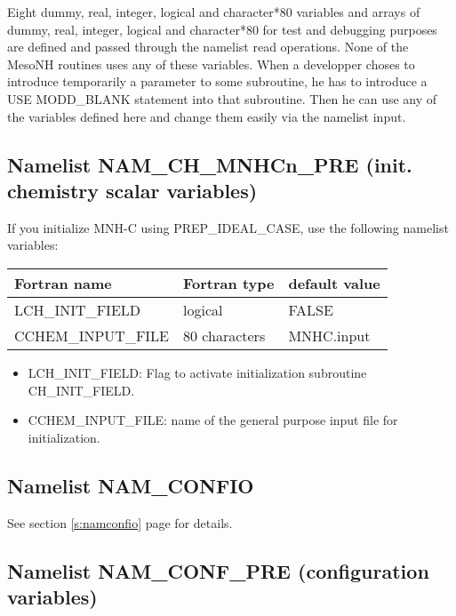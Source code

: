 Eight dummy, real, integer, logical and character*80 variables and
arrays of dummy, real, integer, logical and character*80 for test
and debugging  purposes are defined and passed through the namelist
read operations. None of the MesoNH routines uses any of these
variables. When a developper choses to introduce temporarily a
parameter to some subroutine, he has to introduce a USE MODD\_BLANK
statement into that subroutine. Then he can use any of the variables
defined here and change them easily via the namelist input.



\subsection{Namelist NAM\_CH\_MNHCn\_PRE (init. chemistry scalar variables)}

If you initialize MNH-C using PREP\_IDEAL\_CASE,
use the following namelist variables:
\begin{center}
\begin{tabular} {|l|l|l|}
\hline
Fortran name & Fortran type & default value \\
\hline
LCH\_INIT\_FIELD  & logical       & FALSE      \\
CCHEM\_INPUT\_FILE & 80 characters & MNHC.input \\
\hline
\end{tabular}
\end{center}

\begin{itemize}

\item LCH\_INIT\_FIELD: 
Flag to activate initialization subroutine CH\_INIT\_FIELD.

\item CCHEM\_INPUT\_FILE:
 name of the general purpose input file for initialization.
 

\end{itemize}


\subsection{Namelist NAM\_CONFIO}
See section \ref{s:namconfio} page \pageref{s:namconfio} for details.


\subsection{Namelist NAM\_CONF\_PRE  (configuration variables)}

